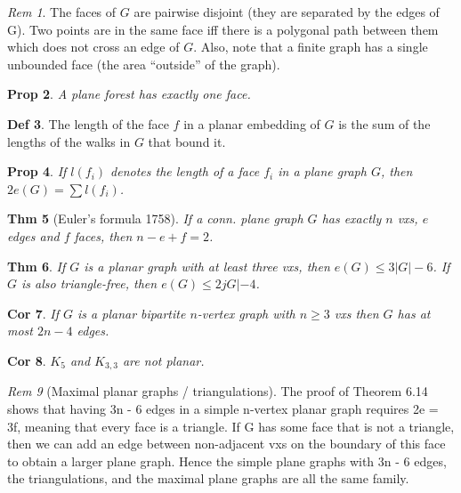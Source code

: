 \documentclass[11pt, fleqn, a4paper, landscape]{article}
\theoremstyle{plain} %
\newtheorem{thm}{Thm}
\newtheorem{pro}[thm]{Prop}
\newtheorem{cor}[thm]{Cor}
\theoremstyle{remark} %
\newtheorem{rem}[thm]{Rem}
\theoremstyle{definition} %
\newtheorem{defi}[thm]{Def}
\begin{document}
\begin{multicols}{5}
\begin{rem}
The faces of $G$ are pairwise disjoint (they are separated by the edges of G). Two points are in the same face iff there is a polygonal path between them which does not cross an edge of $G$. Also, note that a finite graph has a single unbounded face (the area “outside” of the graph).
\end{rem}

\begin{pro}
A plane forest has exactly one face.
\end{pro}

\begin{defi}
The length of the face $f$ in a planar embedding of $G$ is the sum of the lengths of the walks in $G$ that bound it.
\end{defi}
\addtocounter{thm}{1}
\begin{pro}
If $l(f_i)$ denotes the length of a face $f_i$ in a plane graph $G$, then $2e(G) = \sum l(f_i)$.
\end{pro}

\begin{thm}[Euler's formula 1758]
If a conn. plane graph $G$ has exactly $n$ vxs, $e$ edges
and $f$ faces, then $n - e + f = 2$.
\end{thm}

\addtocounter{thm}{1}
\begin{thm}
If $G$ is a planar graph with at least three vxs, then $e(G) \le 3|G|- 6$. If $G$ is also triangle-free, then $e(G)\le 2jG|- 4$.
\end{thm}

\begin{cor}
If $G$ is a planar bipartite $n$-vertex graph with $n \ge 3$ vxs then $G$ has at most $2n - 4$ edges.
\end{cor}

\begin{cor}
$K_5$ and $K_{3,3}$ are not planar.
\end{cor}

\begin{rem}[Maximal planar graphs / triangulations]
The proof of Theorem 6.14 shows that
having 3n - 6 edges in a simple n-vertex planar graph requires 2e = 3f, meaning that every face is
a triangle. If G has some face that is not a triangle, then we can add an edge between non-adjacent
vxs on the boundary of this face to obtain a larger plane graph. Hence the simple plane graphs
with 3n - 6 edges, the triangulations, and the maximal plane graphs are all the same family.
\end{rem}


\end{multicols}
\end{document}
